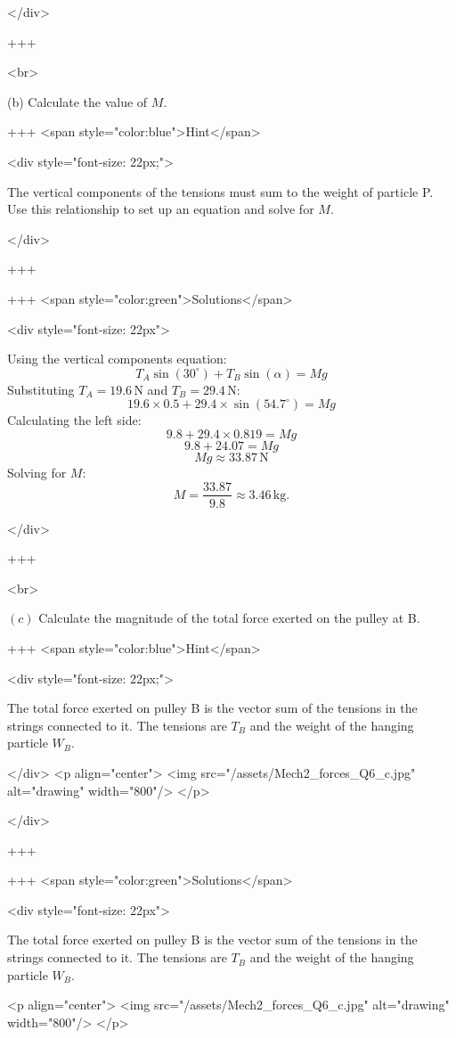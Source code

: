 </div>

+++

<br>


(b) Calculate the value of $M$.

+++ <span style="color:blue">Hint</span>

<div style="font-size: 22px;">

The vertical components of the tensions must sum to the weight of particle P. Use this relationship to set up an equation and solve for \(M\).

</div>

+++

+++ <span style="color:green">Solutions</span>

<div style="font-size: 22px">

Using the vertical components equation:
\[T_A \sin(30^\circ) + T_B \sin(\alpha) = Mg\]
Substituting \(T_A = 19.6 \, \text{N}\) and \(T_B = 29.4 \, \text{N}\):
\[19.6 \times 0.5 + 29.4 \times \sin(54.7^\circ) = Mg\]
Calculating the left side:
\[9.8 + 29.4 \times 0.819 = Mg\]
\[9.8 + 24.07 = Mg\]
\[Mg \approx 33.87 \, \text{N}\]
Solving for \(M\):
\[M = \frac{33.87}{9.8} \approx 3.46 \, \text{kg}.\]

</div>

+++

<br>


\((c)\) Calculate the magnitude of the total force exerted on the pulley at B.

+++ <span style="color:blue">Hint</span>

<div style="font-size: 22px;">

The total force exerted on pulley B is the vector sum of the tensions in the strings connected to it. The tensions are \(T_B\) and the weight of the hanging particle \(W_B\).

</div>
<p align="center">
<img src="/assets/Mech2_forces_Q6_c.jpg" alt="drawing" width="800"/>
</p>

</div>

+++

+++ <span style="color:green">Solutions</span>

<div style="font-size: 22px">

The total force exerted on pulley B is the vector sum of the tensions in the strings connected to it. The tensions are \(T_B\) and the weight of the hanging particle \(W_B\).

<p align="center">
<img src="/assets/Mech2_forces_Q6_c.jpg" alt="drawing" width="800"/>
</p>

